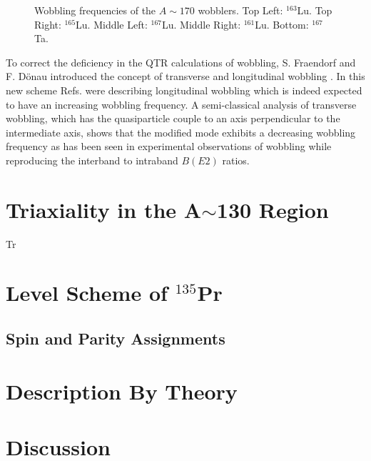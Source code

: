 \begin{figure}[ht!]
	\caption{Wobbling frequencies of the $A\sim{}170$ wobblers. Top Left: $^{163}$Lu. Top Right: $^{165}$Lu. Middle Left: $^{167}$Lu. Middle Right: $^{161}$Lu. Bottom: $^{167}$Ta.\label{fig:chp4-old-wobb-freq}}
\end{figure}

To correct the deficiency in the QTR calculations of wobbling, S. Fraendorf and F. D\"onau introduced the concept of transverse and longitudinal wobbling \cite{frauendorfTransverseWobbling}. In this new scheme Refs. \cite{oldQTRWobblingTheory1,oldQTRWobblingTheory2,oldQTRWobblingTheory3,oldQTRWobblingTheory4} were describing longitudinal wobbling which is indeed expected to have an increasing wobbling frequency. A semi-classical analysis of transverse wobbling, which has the quasiparticle couple to an axis perpendicular to the intermediate axis, shows that the modified mode exhibits a decreasing wobbling frequency as has been seen in experimental observations of wobbling while reproducing the interband to intraband $B(E2)$ ratios.


\section{Triaxiality in the A$\sim$130 Region}
\label{sec:trw-triax}
Tr \cite{groundStateTriax}

\section{Level Scheme of $^{135}$Pr}
\label{sec:trw-lvl-scheme}

\subsection{Spin and Parity Assignments}
\label{ssec:trw-lvl-scheme-assignments}

\section{Description By Theory}
\label{sec:trw-theory-desc}

\section{Discussion}
\label{sec:trw-discussion}